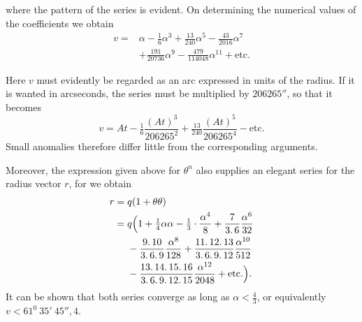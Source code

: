 where the pattern of the series is evident. On determining the numerical values of the coefficients we obtain
\[
\begin{aligned}
v={}&\alpha-\tfrac16\alpha^3+\tfrac{13}{240}\alpha^5-\tfrac{43}{2016}\alpha^7\\
&+\tfrac{191}{20736}\alpha^9-\tfrac{479}{114048}\alpha^{11}+\text{etc.}
\end{aligned}
\]
\par
Here \(v\) must evidently be regarded as an arc expressed in units of the radius. If it is wanted in arcseconds, the series must be multiplied by \(206265''\), so that it becomes
\[
v=At-\tfrac16\frac{(At)^3}{206265^2}+\tfrac{13}{240}\frac{(At)^5}{206265^4}-\text{etc.}
\]
Small anomalies therefore differ little from the corresponding arguments.
\par
Moreover, the expression given above for \(\theta^n\) also supplies an elegant series for the radius vector \(r\), for we obtain
\[
\begin{aligned}
r={}&q(1+\theta\theta)\\
={}&q\Bigl(1+\tfrac14\alpha\alpha-\tfrac13\cdot\frac{\alpha^4}{8}+\frac{7}{3\mathpunct{.}6}\frac{\alpha^6}{32}\\
&-\frac{9\mathpunct{.}10}{3\mathpunct{.}6\mathpunct{.}9}\frac{\alpha^8}{128}
+\frac{11\mathpunct{.}12\mathpunct{.}13}{3\mathpunct{.}6\mathpunct{.}9\mathpunct{.}12}\frac{\alpha^{10}}{512}\\
&-\frac{13\mathpunct{.}14\mathpunct{.}15\mathpunct{.}16}{3\mathpunct{.}6\mathpunct{.}9\mathpunct{.}12\mathpunct{.}15}\frac{\alpha^{12}}{2048}+\text{etc.}\Bigr).
\end{aligned}
\]
It can be shown that both series converge as long as \(\alpha<\tfrac43\), or equivalently \(v<61^0\ 35'\ 45''{,}4\).
\par
